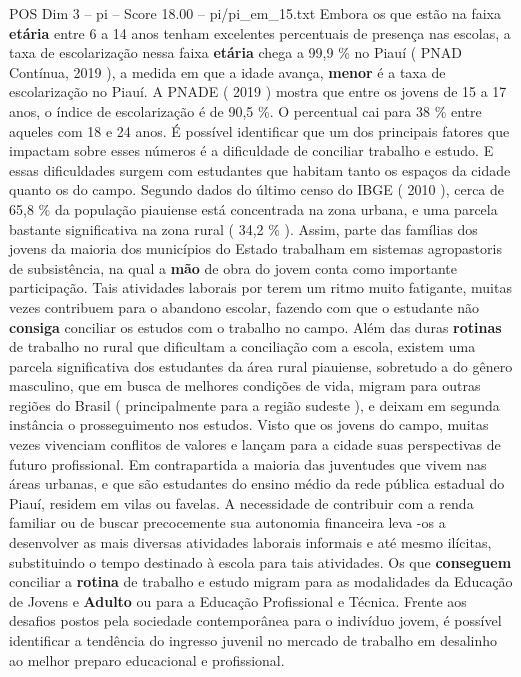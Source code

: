 \begin{textsample}{POS Dim 3 – pi – Score 18.00 – pi/pi\_em\_15.txt}
Embora os que estão na faixa \textbf{etária} entre 6 a 14 anos tenham excelentes percentuais de presença nas escolas, a taxa de escolarização nessa faixa \textbf{etária} chega a 99,9 \% no Piauí ( PNAD Contínua, 2019 ), a medida em que a idade avança, \textbf{menor} é a taxa de escolarização no Piauí.
A PNADE ( 2019 ) mostra que entre os jovens de 15 a 17 anos, o índice de escolarização é de 90,5 \%.
O percentual cai para 38 \% entre aqueles com 18 e 24 anos.
É possível identificar que um dos principais fatores que impactam sobre esses números é a dificuldade de conciliar trabalho e estudo.
E essas dificuldades surgem com estudantes que habitam tanto os espaços da cidade quanto os do campo.
Segundo dados do último censo do IBGE ( 2010 ), cerca de 65,8 \% da população piauiense está concentrada na zona urbana, e uma parcela bastante significativa na zona rural ( 34,2 \% ).
Assim, parte das famílias dos jovens da maioria dos municípios do Estado trabalham em sistemas agropastoris de subsistência, na qual a \textbf{mão} de obra do jovem conta como importante participação.
Tais atividades laborais por terem um ritmo muito fatigante, muitas vezes contribuem para o abandono escolar, fazendo com que o estudante não \textbf{consiga} conciliar os estudos com o trabalho no campo.
Além das duras \textbf{rotinas} de trabalho no rural que dificultam a conciliação com a escola, existem uma parcela significativa dos estudantes da área rural piauiense, sobretudo a do gênero masculino, que em busca de melhores condições de vida, migram para outras regiões do Brasil ( principalmente para a região sudeste ), e deixam em segunda instância o prosseguimento nos estudos.
Visto que os jovens do campo, muitas vezes vivenciam conflitos de valores e lançam para a cidade suas perspectivas de futuro profissional.
Em contrapartida a maioria das juventudes que vivem nas áreas urbanas, e que são estudantes do ensino médio da rede pública estadual do Piauí, residem em vilas ou favelas.
A necessidade de contribuir com a renda familiar ou de buscar precocemente sua autonomia financeira leva -os a desenvolver as mais diversas atividades laborais informais e até mesmo ilícitas, substituindo o tempo destinado à escola para tais atividades.
Os que \textbf{conseguem} conciliar a \textbf{rotina} de trabalho e estudo migram para as modalidades da Educação de Jovens e \textbf{Adulto} ou para a Educação Profissional e Técnica.
Frente aos desafios postos pela sociedade contemporânea para o indivíduo jovem, é possível identificar a tendência do ingresso juvenil no mercado de trabalho em desalinho ao melhor preparo educacional e profissional.

\end{textsample}
